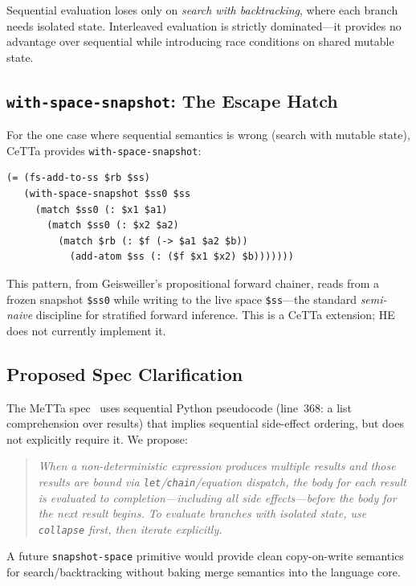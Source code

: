 \documentclass[11pt]{article}
\newcommand{\code}[1]{\texttt{#1}}
\newcommand{\HE}{\textup{HE}}
\newcommand{\CeTTa}{\textup{CeTTa}}
\begin{document}
Sequential evaluation loses only on \emph{search with backtracking},
where each branch needs isolated state.  Interleaved evaluation
is strictly dominated---it provides no advantage over sequential
while introducing race conditions on shared mutable state.

\subsection{\code{with-space-snapshot}: The Escape Hatch}

For the one case where sequential semantics is wrong (search with
mutable state), \CeTTa{} provides \code{with-space-snapshot}:
\begin{lstlisting}[language={},basicstyle=\ttfamily\scriptsize]
(= (fs-add-to-ss $rb $ss)
   (with-space-snapshot $ss0 $ss
     (match $ss0 (: $x1 $a1)
       (match $ss0 (: $x2 $a2)
         (match $rb (: $f (-> $a1 $a2 $b))
           (add-atom $ss (: ($f $x1 $x2) $b)))))))
\end{lstlisting}

This pattern, from Geisweiller's propositional forward chainer,
reads from a frozen snapshot \code{\$ss0} while writing to the
live space \code{\$ss}---the standard \emph{semi-naive} discipline
for stratified forward inference.  This is a \CeTTa{} extension;
\HE{} does not currently implement it.

\subsection{Proposed Spec Clarification}

The MeTTa spec~\cite{metta} uses sequential Python pseudocode
(line~368: a list comprehension over results) that implies
sequential side-effect ordering, but does not explicitly require
it.  We propose:

\begin{quote}
\emph{When a non-deterministic expression produces multiple results
and those results are bound via \code{let}/\code{chain}/equation
dispatch, the body for each result is evaluated to completion---including
all side effects---before the body for the next result begins.
To evaluate branches with isolated state, use \code{collapse}
first, then iterate explicitly.}
\end{quote}

A future \code{snapshot-space} primitive would provide clean
copy-on-write semantics for search/backtracking without baking
merge semantics into the language core.
\end{document}
